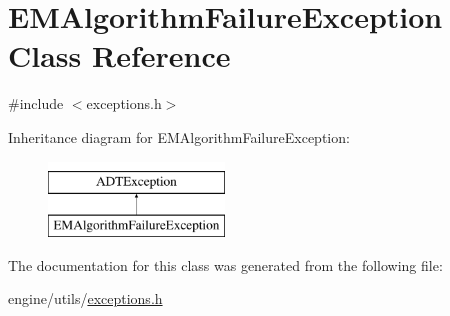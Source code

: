 \hypertarget{classEMAlgorithmFailureException}{
\section{EMAlgorithmFailureException Class Reference}
\label{classEMAlgorithmFailureException}
}


{\ttfamily \#include $<$exceptions.h$>$}

Inheritance diagram for EMAlgorithmFailureException:\begin{figure}[H]
\begin{center}
\leavevmode
\includegraphics[height=2cm]{classEMAlgorithmFailureException}
\end{center}
\end{figure}


The documentation for this class was generated from the following file:\begin{DoxyCompactItemize}
\item 
engine/utils/\hyperlink{exceptions_8h}{exceptions.h}\end{DoxyCompactItemize}
